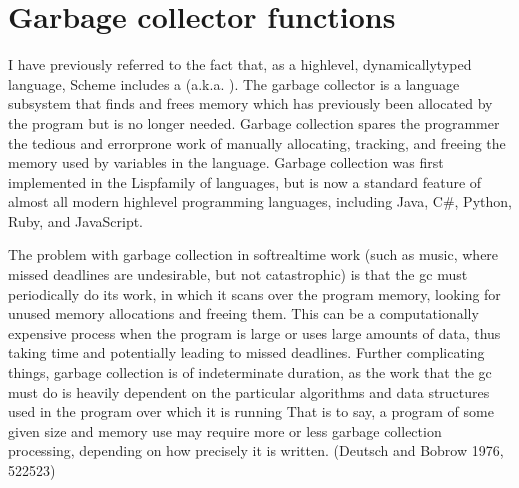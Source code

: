 \documentclass[letterpaper,10pt,english]{sphinxmanual}
\begin{document}
\section{Garbage collector functions}
\label{\detokenize{features_usage:garbage-collector-functions}}
\sphinxAtStartPar
I have previously referred to the fact that, as a high\sphinxhyphen{}level, dynamically\sphinxhyphen{}typed language, Scheme includes a
 (a.k.a. ).
The garbage collector is a language subsystem that finds and
frees memory which has previously been allocated by the program but is no longer needed.
Garbage collection spares the programmer the tedious and error\sphinxhyphen{}prone work of manually allocating,
tracking, and freeing the memory used by variables in the language.
Garbage collection was first implemented in the Lisp\sphinxhyphen{}family of languages,
but is now a standard feature of almost all modern high\sphinxhyphen{}level programming languages,
including Java, C\#, Python, Ruby, and JavaScript.

\sphinxAtStartPar
The problem with garbage collection in soft\sphinxhyphen{}realtime
work (such as music, where missed deadlines are undesirable, but not catastrophic)
is that the gc must periodically do its work, in which it scans over the program
memory, looking for unused memory allocations and freeing them.
This can be a computationally expensive process when the program is large or
uses large amounts of data, thus taking time and potentially leading to missed deadlines.
Further complicating things, garbage collection is of indeterminate duration,
as the work that the gc must do is heavily dependent on the particular algorithms
and data structures used in the program over which it is running
That is to say, a program of some given size and memory use may require more or less
garbage collection processing, depending on how precisely it is written. (Deutsch and Bobrow 1976, 522\sphinxhyphen{}523)
\end{document}
